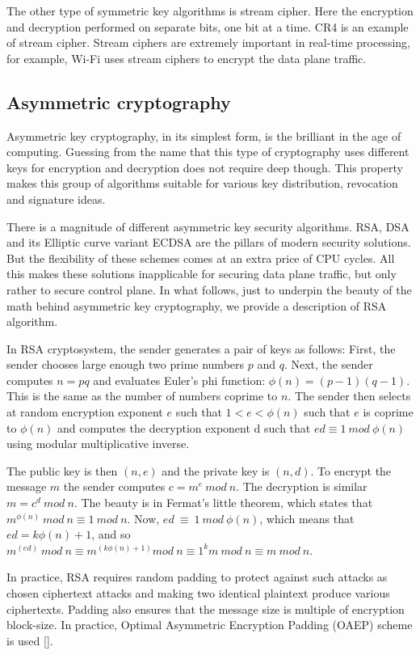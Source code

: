 The other type of symmetric key algorithms is stream cipher. Here the encryption 
and decryption performed on separate bits, one bit at a time. CR4 is an example 
of stream cipher. Stream ciphers are extremely important in real-time processing, 
for example, Wi-Fi uses stream ciphers to encrypt the data plane traffic.

\subsection{Asymmetric cryptography}

Asymmetric key cryptography, in its simplest form, is the brilliant in the age 
of computing. Guessing from the name that this type of cryptography uses different 
keys for encryption and decryption does not require deep though. This property makes 
this group of algorithms suitable for various key distribution, revocation and 
signature ideas. 

There is a magnitude of different asymmetric key security algorithms. 
RSA, DSA and its Elliptic curve variant ECDSA are the pillars of modern 
security solutions. But the flexibility of these schemes comes at an extra 
price of CPU cycles. All this makes these solutions inapplicable for securing 
data plane traffic, but only rather to secure control plane. In what follows, 
just to underpin the beauty of the math behind asymmetric key cryptography, 
we provide a description of RSA algorithm.

In RSA cryptosystem, the sender generates a pair of keys as follows: 
First, the sender chooses large enough two prime numbers $p$ and $q$. Next, 
the sender computes $n=pq$ and evaluates Euler’s phi function: $\phi(n)=(p-1)(q-1)$. 
This is the same as the number of numbers coprime to $n$. The sender then selects at 
random encryption exponent $e$ such that $1<e<\phi(n)$ such that $e$ is coprime to $\phi(n)$ 
and computes the decryption exponent d such that $ed \equiv 1\ mod\ \phi(n)$ using modular 
multiplicative inverse.

The public key is then $(n, e)$ and the private key is $(n, d)$. To encrypt the message $m$ 
the sender computes $c= m^e\ mod\ n$. The decryption is similar $m = c^d\ mod\ n$. The beauty is 
in Fermat’s little theorem, which states that $m^{\phi(n)}\ mod\ n \equiv 1\ mod\ n$. 
Now, $ed\ \equiv\ 1\ mod\ \phi(n)$, which means that 
$ed=k\phi(n)+1$, and so $m^{(ed)}\ mod\ n \equiv m^{(k\phi(n)+1)} mod\ n \equiv 1^k m\ mod\ n \equiv m\ mod\ n$. 

In practice, RSA requires random padding to protect against such attacks as chosen ciphertext 
attacks and making two identical plaintext produce various ciphertexts. Padding also ensures that the 
message size is multiple of encryption block-size. In practice, Optimal Asymmetric Encryption Padding (OAEP) 
scheme is used [].

